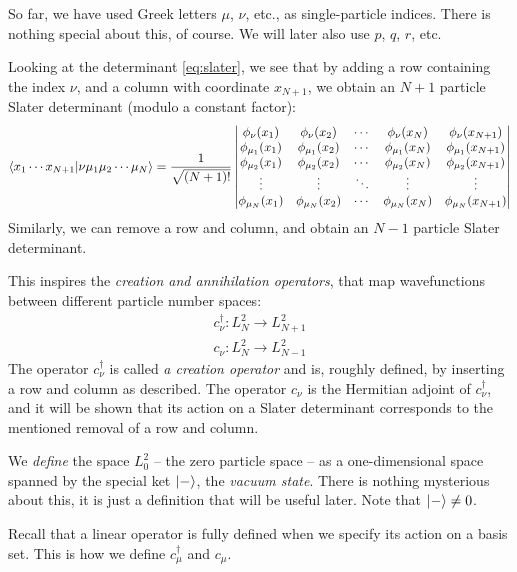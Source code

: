 \documentclass{report}
\theoremstyle{plain}
\theoremstyle{definition}
\begin{document}
So far, we have used Greek letters $\mu$, $\nu$, etc., as
single-particle indices. There is nothing special about this, of
course. We will later also use $p$, $q$, $r$, etc.

Looking at the determinant \eqref{eq:slater}, we see that by adding a
row containing the index $\nu$, and a column with coordinate
$x_{N+1}$, we obtain an $N+1$ particle Slater determinant (modulo a
constant factor):
\begin{equation}
  \braket{x_1\cdots x_{N+1}|\nu\mu_1\mu_2\cdots\mu_N} = \frac{1}{\sqrt{(N+1)!}} \begin{vmatrix}
    \phi_{\nu}(x_1) & \phi_{\nu}(x_2) & \cdots & \phi_{\nu}(x_N) & \phi_{\nu}(x_{N+1}) \\
    \phi_{\mu_1}(x_1) & \phi_{\mu_1}(x_2) & \cdots & \phi_{\mu_1}(x_N) & \phi_{\mu_1}(x_{N+1}) \\
    \phi_{\mu_2}(x_1) & \phi_{\mu_2}(x_2) & \cdots & \phi_{\mu_2}(x_N)
    & \phi_{\mu_2}(x_{N+1}) \\
    \vdots & \vdots & \ddots & \vdots & \vdots \\
    \phi_{\mu_N}(x_1) & \phi_{\mu_N}(x_2) & \cdots & \phi_{\mu_N}(x_N)
    & \phi_{\mu_N}(x_{N+1})\\
  \end{vmatrix}
\end{equation}
Similarly, we can remove a row and column, and obtain an $N-1$
particle Slater determinant.

This inspires the \emph{creation and annihilation operators}, that
map wavefunctions between different particle number spaces:
\begin{gather}
  c^\dag_\nu : L^2_N \to L^2_{N+1} \\
  c_\nu : L^2_N \to L^2_{N-1}
\end{gather}
The operator $c^\dag_\nu$ is called \emph{a creation operator} and is,
roughly defined, by inserting a row and column as described. The
operator $c_\nu$ is the Hermitian adjoint of $c^\dag_\nu$, and it will
be shown that its action on a Slater determinant corresponds to the
mentioned removal of a row and column.


We \emph{define} the space $L^2_0$ -- the zero particle space --
as a one-dimensional space spanned by the special ket $\ket{-}$, the
\emph{vacuum state}. There is nothing mysterious about this, it is
just a definition that will be useful later. Note that $\ket{-} \neq 0$.


Recall that a linear operator is fully defined when we specify its
action on a basis set. This is how we define $c^\dag_\mu$ and $c_\mu$.
\end{document}
